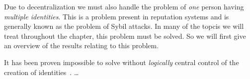 Due to decentralization we must also handle the problem of \emph{one} person 
having \emph{multiple identities}.
This is a problem present in reputation systems and is generally known as the 
problem of Sybil attacks.
In many of the topcis we will treat throughout the chapter, this problem must 
be solved.
So we will first give an overview of the results relating to this problem.

It has been proven impossible to solve without \emph{logically} central control 
of the creation of identities~\cite{SybilAttack}.
\dots
